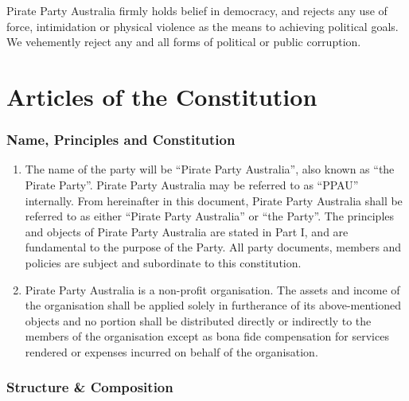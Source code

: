 \documentclass[a4paper,titlepage,8.5pt]{article}
\begin{document}
Pirate Party Australia firmly holds belief in democracy, and rejects any use of force, intimidation or physical violence as the means to achieving political goals. We vehemently reject any and all forms of political or public corruption.
\newpage

\part{Articles of the Constitution}

\section{Name, Principles and Constitution}

\begin{enumerate}
\item The name of the party will be ``Pirate Party Australia'', also known as ``the Pirate Party''. Pirate Party Australia may be referred to as ``PPAU'' internally. From hereinafter in this document, Pirate Party Australia shall be referred to as either ``Pirate Party Australia'' or ``the Party''. The principles and objects of Pirate Party Australia are stated in Part I, and are fundamental to the purpose of the Party. All party documents, members and policies are subject and subordinate to this constitution.
\item Pirate Party Australia is a non-profit organisation. The assets and income of the organisation shall be applied solely in furtherance of its above-mentioned objects and no portion shall be distributed directly or indirectly to the members of the organisation except as bona fide compensation for services rendered or expenses incurred on behalf of the organisation.
\end{enumerate}

\section{Structure \& Composition}
\end{document}
